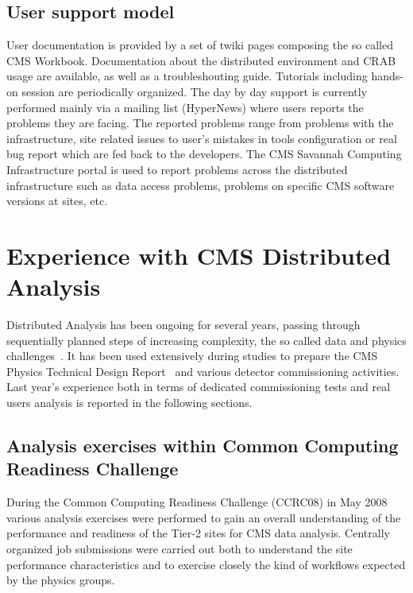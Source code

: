 \subsection{User support model}
\label{sec:4_4}
User documentation is provided by a set of twiki pages composing the so called CMS Workbook. Documentation about the distributed environment and CRAB usage are available, as well as a troubleshouting guide.
Tutorials including hands-on session are periodically organized.
The day by day support is currently performed mainly via a mailing list (HyperNews) where users reports the problems they are facing. The reported problems range from problems with the infrastructure, 
site related issues to user's mistakes in tools configuration or real bug report which are fed back to the developers.
The CMS Savannah Computing Infrastructure portal is used to report problems across the distributed infrastructure such as data access problems, problems on specific CMS software versions at sites, etc.

\section{Experience with CMS Distributed Analysis}
\label{sec:5}

Distributed Analysis has been ongoing for several years, passing through sequentially planned steps of 
increasing complexity, the so called data and physics challenges~\cite{RefPastExp}. 
It has been used extensively during studies to prepare the CMS Physics Technical Design Report~\cite{PTDR} and various detector commissioning activities. 
Last year's experience both in terms of dedicated commissioning tests and real users analysis is reported in the following sections.

\subsection{Analysis exercises within Common Computing Readiness Challenge}
\label{sec:5_1}
During the Common Computing Readiness Challenge (CCRC08) in May 2008
various analysis exercises were performed to gain an overall understanding 
of the performance and readiness of the Tier-2 sites for CMS data analysis.
Centrally organized job submissions were carried out both to understand the site performance characteristics and to exercise closely the kind of workflows
expected by the physics groups.
